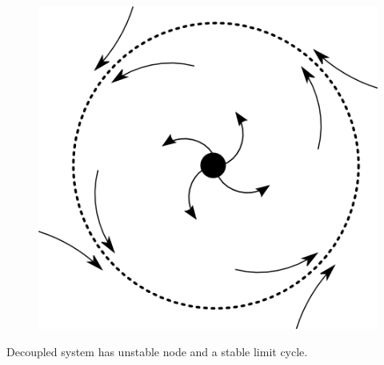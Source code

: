 \documentclass[10pt,reqno]{beamer}
\begin{document}
\begin{frame}
\begin{columns}[t]
\begin{column}{.49\textwidth}
\begin{figure}
\includegraphics[scale = 0.16]{hopf.png}
\end{figure}
Decoupled system has unstable node and a stable limit cycle.
\end{column}
\end{columns}
\end{frame}
\end{document}

